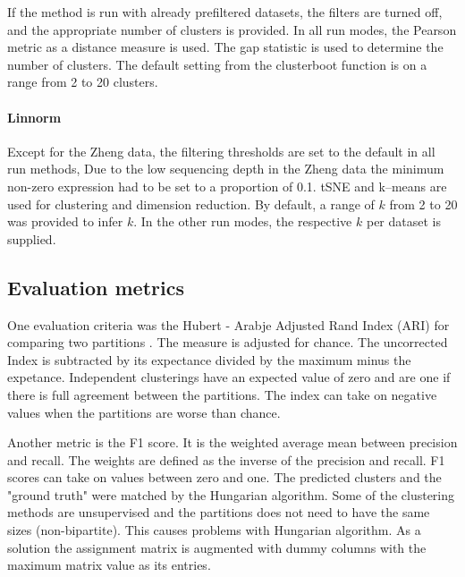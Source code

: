 \documentclass[11pt, a4paper]{article}\usepackage[]{graphicx}\usepackage[]{color}
\begin{document}
If the method is run with already prefiltered datasets, the filters are turned off, and the appropriate number of clusters is provided. 
In all run modes, the Pearson metric as a distance measure is used.
The gap statistic is used to determine the number of clusters. The default setting from the clusterboot function is on a range from 2 to 20 clusters.

\paragraph{Linnorm}
Except for the  Zheng data, the filtering thresholds are set to the default in all run methods,  Due to the low sequencing depth in the Zheng data the minimum non-zero expression had to be set to a proportion of 0.1. tSNE and k--means are used for clustering and dimension reduction. By default, a range of  $k$ from 2 to 20  was provided to infer $k$.  In the other run modes, the respective $k$ per dataset is supplied.
\subsection{Evaluation metrics}
One evaluation criteria was the Hubert - Arabje Adjusted Rand Index (ARI) for comparing two partitions \citep{hubert1985comparing}. The measure is adjusted for chance. The uncorrected Index is subtracted by its expectance divided by the maximum minus the expetance. Independent clusterings have an expected value of zero and are one if there is full agreement between the partitions. The index can take on negative values when the partitions are worse than chance. 

Another metric is the F1 score. It is the weighted average mean between precision and recall. The weights are defined as the inverse of the precision and recall. F1 scores can take on values between zero and  one. The predicted clusters and the "ground truth" were matched by the Hungarian algorithm. Some of the clustering methods are unsupervised and the partitions does not need to have the same sizes (non-bipartite). This causes problems with Hungarian algorithm. As a solution the assignment matrix is augmented with dummy columns with the maximum matrix value as its entries.
\newpage

\end{document}
